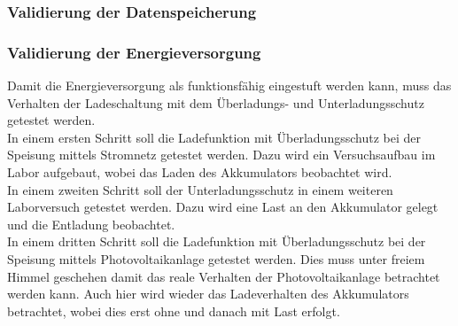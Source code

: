 \subsubsection{Validierung der Datenspeicherung}
\subsubsection{Validierung der Energieversorgung}
Damit die Energieversorgung als funktionsfähig eingestuft werden kann, muss das Verhalten der Ladeschaltung mit dem Überladungs- und Unterladungsschutz getestet werden.\\
In einem ersten Schritt soll die Ladefunktion mit Überladungsschutz bei der Speisung mittels Stromnetz getestet werden. Dazu wird ein Versuchsaufbau im Labor aufgebaut, wobei das Laden des Akkumulators beobachtet wird.\\
In einem zweiten Schritt soll der Unterladungsschutz in einem weiteren Laborversuch getestet werden. Dazu wird eine Last an den Akkumulator gelegt und die Entladung beobachtet.\\
In einem dritten Schritt soll die Ladefunktion mit Überladungsschutz bei der Speisung mittels Photovoltaikanlage getestet werden. Dies muss unter freiem Himmel geschehen damit das reale Verhalten der Photovoltaikanlage betrachtet werden kann. Auch hier wird wieder das Ladeverhalten des Akkumulators betrachtet, wobei dies erst ohne und danach mit Last erfolgt.\\